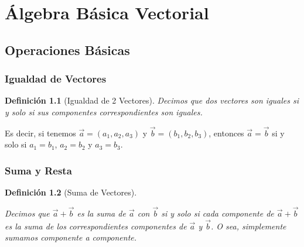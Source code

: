 \documentclass[12pt, fleqn]{report}                             %
\newtheorem{Definition}{Definición}[section]                    %
\theoremstyle{break}                                            %
\begin{document}
    \chapter{Álgebra Básica Vectorial}
            

        \clearpage
        \section{Operaciones Básicas}
            
            \subsection{Igualdad de Vectores}

                \begin{Definition}[Igualdad de 2 Vectores]
                    \label{DefIgualdadVectores}
                    Decimos que dos vectores son iguales si y solo si sus componentes
                    correspondientes son iguales.
                \end{Definition}

                Es decir, si tenemos $\vec{a} = (a_1, a_2, a_3)$ y $\vec{b} = (b_1, b_2, b_3)$,
                entonces $\vec{a} = \vec{b}$ si y solo si $a_1 = b_1$, $a_2 = b_2$ y $a_3 = b_3$.

            
            \subsection{Suma y Resta}
            
                \begin{Definition}[Suma de Vectores]
                    \label{DefSumaVectores}

                    Decimos que $\vec{a}+\vec{b}$ es la suma de $\vec{a}$ con $\vec{b}$ si y solo si 
                    cada componente de $\vec{a}+\vec{b}$ es la suma de los correspondientes componentes
                    de $\vec{a}$ y $\vec{b}$.
                    O sea, simplemente sumamos componente a componente.

                \end{Definition}
\end{document}
